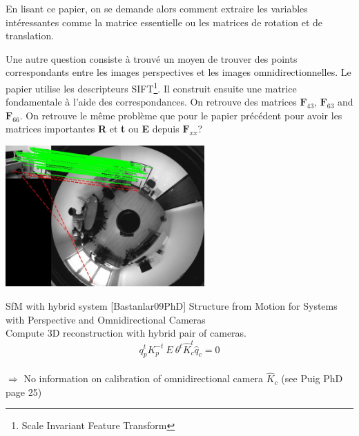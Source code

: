 En lisant ce papier, on se demande alors comment extraire les variables intéressantes comme la matrice essentielle ou les matrices de rotation et de translation.

Une autre question consiste à trouvé un moyen de trouver des points correspondants entre les images perspectives et les images omnidirectionnelles.
Le papier \cite{Puig08} utilise les descripteurs SIFT\footnote{Scale Invariant Feature Transform}.
Il construit ensuite une matrice fondamentale à l'aide des correspondances.
On retrouve des matrices $\mathbf{F}_{43}$, $\mathbf{F}_{63}$ and $\mathbf{F}_{66}$.
On retrouve le même problème que pour le papier précédent pour avoir les matrices importantes \textbf{R} et \textbf{t} ou \textbf{E} depuis $\mathbf{F}_{xx}$?

\newpage

\begin{minipage}[c]{0.5\textwidth}
  \centering
  \includegraphics[width=3.0in]{images/Bastanlar09.png}
  \label{fig:sample_figure}
\end{minipage}
\begin{minipage}[c]{0.5\textwidth}


  SfM with hybrid system [Bastanlar09PhD] Structure from Motion for Systems with Perspective and Omnidirectional Cameras\\
  Compute 3D reconstruction with hybrid pair of cameras.\\
  $$q_p^t K_p^{-t} ~E~ \theta^t \hat{K}_c^t \hat{q}_c = 0$$\\
  $\Rightarrow$ No information on calibration of omnidirectional camera $\hat{K}_c$ (see Puig PhD page 25)
\end{minipage}

